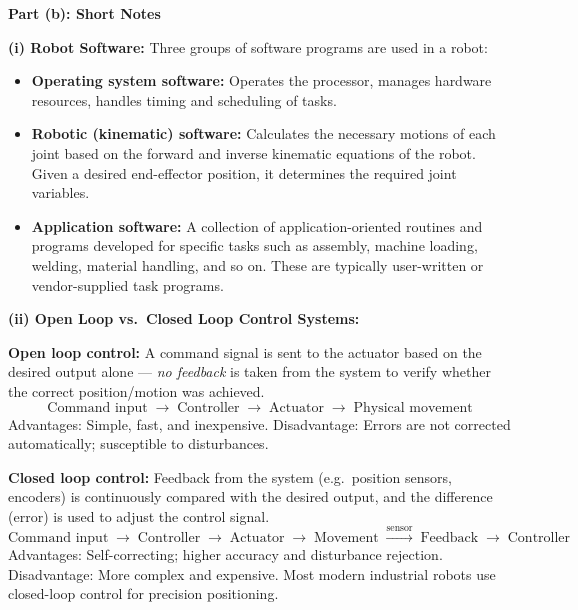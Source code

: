 \documentclass[12pt,a3paper]{article}
\begin{document}
\begin{enumerate}
\begin{tcolorbox}[enhanced,breakable,ansbox,colback=cA!4,colframe=cA,
  boxrule=0.8pt,arc=5pt,
  title={\textbf{Answer}},fonttitle=\bfseries\color{white},colbacktitle=cA]
\textbf{Part (b): Short Notes}

\textbf{(i) Robot Software:}
Three groups of software programs are used in a robot:
\begin{itemize}[leftmargin=1.5em,itemsep=2pt]
  \item \textbf{Operating system software:} Operates the processor, manages
        hardware resources, handles timing and scheduling of tasks.
  \item \textbf{Robotic (kinematic) software:} Calculates the necessary motions
        of each joint based on the forward and inverse kinematic equations of
        the robot. Given a desired end-effector position, it determines the
        required joint variables.
  \item \textbf{Application software:} A collection of application-oriented
        routines and programs developed for specific tasks such as assembly,
        machine loading, welding, material handling, and so on. These are
        typically user-written or vendor-supplied task programs.
\end{itemize}

\textbf{(ii) Open Loop vs.\ Closed Loop Control Systems:}

\textbf{Open loop control:} A command signal is sent to the actuator based on
the desired output alone — \emph{no feedback} is taken from the system to
verify whether the correct position/motion was achieved.
\[
  \text{Command input} \;\to\; \text{Controller} \;\to\;
  \text{Actuator} \;\to\; \text{Physical movement}
\]
Advantages: Simple, fast, and inexpensive. Disadvantage: Errors are not
corrected automatically; susceptible to disturbances.

\textbf{Closed loop control:} Feedback from the system (e.g.\ position sensors,
encoders) is continuously compared with the desired output, and the difference
(error) is used to adjust the control signal.
\[
  \text{Command input} \;\to\; \text{Controller} \;\to\;
  \text{Actuator} \;\to\; \text{Movement}
  \;\xrightarrow{\text{sensor}}\; \text{Feedback} \;\to\; \text{Controller}
\]
Advantages: Self-correcting; higher accuracy and disturbance rejection.
Disadvantage: More complex and expensive. Most modern industrial robots use
closed-loop control for precision positioning.

\end{tcolorbox}


\end{enumerate}
\end{document}
